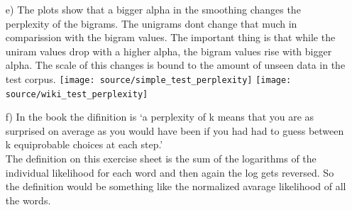 \documentclass{article}
\begin{document}
\begin{itemize}
		\item[e)]
		The plots show that a bigger alpha in the smoothing changes the perplexity of the bigrams. The unigrams dont change that much in comparission with the bigram values. The important thing is that while the uniram values drop with a higher alpha, the bigram values rise with bigger alpha. The scale of this changes is bound to the amount of unseen data in the test corpus.
		\texttt{[image: source/simple\_test\_perplexity]}
		\texttt{[image: source/wiki\_test\_perplexity]}
		\item[f)] In the book the difinition is `a perplexity of k means that you are as surprised
on average as you would have been if you had had to guess between
k equiprobable choices at each step.'\\
The definition on this exercise sheet is the sum of the logarithms of the individual likelihood for each word and then again the log gets reversed. So the definition would be something like the normalized avarage likelihood of all the words.
\end{itemize}
\end{document}
